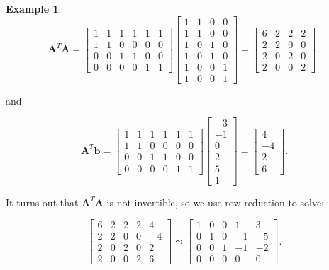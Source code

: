 \documentclass[
]{book}
\theoremstyle{definition}
\theoremstyle{definition}
\newtheorem{example}{Example}[chapter]
\theoremstyle{definition}
\theoremstyle{definition}
\theoremstyle{remark}
\begin{document}
\begin{examplebox}
\begin{example}
\[\mathbf{A}^T\mathbf{A}=\begin{bmatrix}1 & 1 & 1 & 1 & 1 & 1\\1 & 1 & 0 & 0 & 0 & 0\\0 & 0 & 1 & 1 & 0 & 0\\0 & 0 & 0 & 0 & 1 & 1\end{bmatrix}\begin{bmatrix}1 & 1 & 0 & 0\\1 & 1 & 0 & 0\\1 & 0 & 1 & 0\\1 & 0 & 1 & 0\\1 & 0 & 0 & 1\\1 & 0 & 0 & 1\end{bmatrix}=\begin{bmatrix}6 & 2 & 2 & 2\\2 & 2 & 0 & 0\\2 & 0 & 2 & 0\\2 & 0 & 0 & 2\end{bmatrix},\]

and

\[\mathbf{A}^T\mathbf{b}=\begin{bmatrix}1 & 1 & 1 & 1 & 1 & 1\\1 & 1 & 0 & 0 & 0 & 0\\0 & 0 & 1 & 1 & 0 & 0\\0 & 0 & 0 & 0 & 1 & 1\end{bmatrix}\begin{bmatrix}-3\\-1\\0\\2\\5\\1\end{bmatrix}=\begin{bmatrix}4\\-4\\2\\6\end{bmatrix}.\]

It turns out that \(\mathbf{A}^T\mathbf{A}\) is not invertible, so we use row reduction to solve:

\[\left[\begin{array}{cccc|r} 6 & 2 & 2 & 2 & 4\\2 & 2 & 0 & 0& -4\\2 & 0 & 2 & 0 & 2\\2 & 0 & 0 & 2& 6\end{array}\right] \leadsto \left[\begin{array}{cccr|r}1 & 0 & 0 & 1 & 3\\0 & 1 & 0 & -1 & -5\\0 & 0 & 1 & -1 & -2\\0 & 0 & 0 & 0 & 0\end{array}\right].\]


\end{example}
\end{examplebox}
\end{document}
